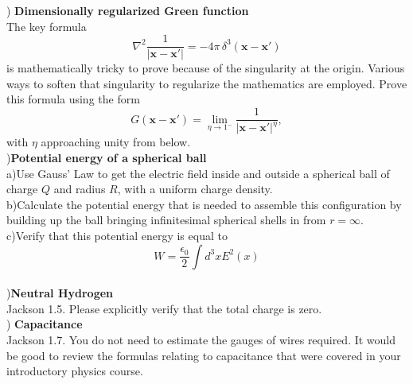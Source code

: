 \documentclass[letterpage]{article}
\begin{document}
) \textbf{Dimensionally regularized Green function}\\
The key formula
\begin{equation}
  \nabla^2 \frac{1}{|\mathbf{x} - \mathbf{x'}|} = -4\pi \,\delta^3 (\mathbf{x} - 
  \mathbf{x'})
\end{equation}
is mathematically tricky to prove because of the singularity at the origin.
Various ways to soften that singularity to regularize the mathematics are
employed. Prove this formula using the form
\begin{equation}
  G(\mathbf{x}-\mathbf{x'}) = \lim_{\eta \to 1^-} \frac{1}{|\mathbf{x}-
  \mathbf{x'}|^\eta},
\end{equation}
with $\eta$ approaching unity from below.\\

)\textbf{Potential energy of a spherical ball}\\
a)Use Gauss' Law to get the electric field inside and outside a spherical
ball of charge $Q$ and radius $R$, with a uniform charge density.\\
b)Calculate the potential energy that is needed to assemble this configuration
by building up the ball bringing infinitesimal spherical shells in from 
$r = \infty$.\\
c)Verify that this potential energy is equal to
\begin{equation}
  W = \frac{\epsilon_0}{2} \int d^3xE^2(x)
\end{equation}\\

)\textbf{Neutral Hydrogen}\\
Jackson 1.5. Please explicitly verify that the total charge is zero.\\

) \textbf{Capacitance}\\
Jackson 1.7. You do not need to estimate the gauges of wires required.
It would be good to review the formulas relating to capacitance that were
covered in your introductory physics course.
\end{document}
